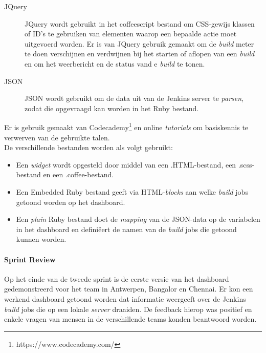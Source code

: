 \documentclass[10pt,a4paper]{article}
\begin{document}
\begin{description}
\item[JQuery] JQuery wordt gebruikt in het coffeescript bestand om CSS-gewijs klassen of ID's te gebruiken van elementen waarop een bepaalde actie moet uitgevoerd worden. Er is van JQuery gebruik gemaakt om de \textit{build} meter te doen verschijnen en verdwijnen bij het starten of aflopen van een \textit{build} en om het weerbericht en de status vand e \textit{build} te tonen.
\item[JSON] JSON wordt gebruikt om de data uit van de Jenkins server te \textit{parsen}, zodat die opgevraagd kan worden in het Ruby bestand.
\end{description}
Er is gebruik gemaakt van Codecademy\footnote{https://www.codecademy.com/} en online \textit{tutorials} om basiskennis te verwerven van de gebruikte talen.\\

De verschillende bestanden worden als volgt gebruikt:
\begin{itemize}
\item Een \textit{widget} wordt opgesteld door middel van een .HTML-bestand, een .scss-bestand en een .coffee-bestand.
\item Een Embedded Ruby bestand geeft via HTML-\textit{blocks} aan welke \textit{build} jobs getoond worden op het dashboard.
\item Een \textit{plain} Ruby bestand doet de \textit{mapping} van de JSON-data op de variabelen in het dashboard en defini\"eert de namen van de \textit{build} jobs die getoond kunnen worden.
\end{itemize}
\paragraph{Sprint Review} Op het einde van de tweede sprint is de eerste versie van het dashboard gedemonstreerd voor het team in Antwerpen, Bangalor en Chennai. Er kon een werkend dashboard getoond worden dat informatie weergeeft over de Jenkins \textit{build} jobs die op een lokale \textit{server} draaiden. De feedback hierop was positief en enkele vragen van mensen in de verschillende teams konden beantwoord worden. 
\end{document}
